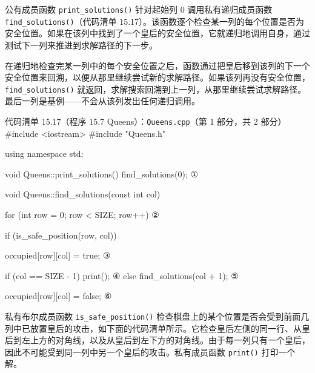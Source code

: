 公有成员函数 \texttt{print\_\allowbreak{}solutions(\allowbreak{})\allowbreak{}} 针对起始列 0 调用私有递归成员函数 \texttt{find\_\allowbreak{}solutions(\allowbreak{})\allowbreak{}}（代码清单 15.17）。该函数逐个检查某一列的每个位置是否为安全位置。如果在该列中找到了一个皇后的安全位置，它就递归地调用自身，通过测试下一列来推进到求解路径的下一步。

在递归地检查完某一列中的每个安全位置之后，函数通过把皇后移到该列的下一个安全位置来回溯，以便从那里继续尝试新的求解路径。如果该列再没有安全位置，\texttt{find\_\allowbreak{}solutions(\allowbreak{})\allowbreak{}} 就返回，求解搜索回溯到上一列，从那里继续尝试求解路径。最后一列是基例——不会从该列发出任何递归调用。

\begin{codeboxt}{代码清单 15.17（程序 15.7 Queens）：\texttt{Queens.\allowbreak{}cpp}（第 1 部分，共 2 部分）}
#include <iostream>
#include "Queens.h"

using namespace std;

void Queens::print_solutions()
{
    find_solutions(0);                                    ①
}

void Queens::find_solutions(const int col)
{
    for (int row = 0; row < SIZE; row++)                  ②
    {
        if (is_safe_position(row, col))
        {
            occupied[row][col] = true;                    ③

            if (col == SIZE - 1) print();                 ④
            else                 find_solutions(col + 1); ⑤
        }

        occupied[row][col] = false;                       ⑥
    }
}
\end{codeboxt}
\par
{}\par
{}\par
{}\par
{}\par
{}\par


私有布尔成员函数 \texttt{is\_\allowbreak{}safe\_\allowbreak{}position(\allowbreak{})\allowbreak{}} 检查棋盘上的某个位置是否会受到前面几列中已放置皇后的攻击，如下面的代码清单所示。它检查皇后左侧的同一行、从皇后到左上方的对角线，以及从皇后到左下方的对角线。由于每一列只有一个皇后，因此不可能受到同一列中另一个皇后的攻击。私有成员函数 \texttt{print()} 打印一个解。

